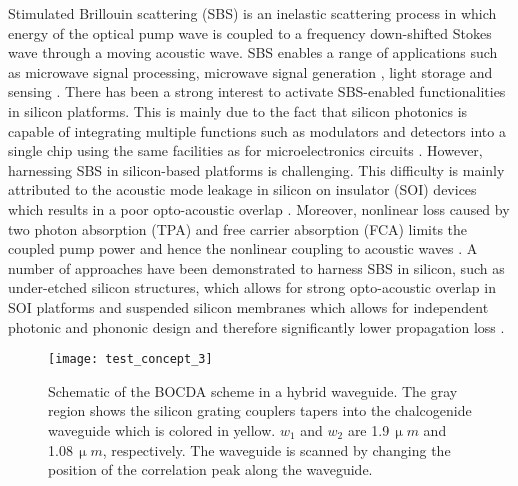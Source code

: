 \documentclass[superscriptaddress, nofootinbib, twocolumn, amsmath,amssymb, aps, pra, notitlepage, longbibliography]{revtex4-1}
\begin{document}
%
%

Stimulated Brillouin scattering (SBS) is an inelastic scattering process in which energy of the optical pump wave is coupled to a frequency down-shifted Stokes wave through a moving acoustic wave. SBS enables a range of applications such as microwave signal processing\cite{Marpaung2013,Pagani2014a,Santagiustina2013}, microwave signal generation \cite{Li2013,Merklein2016}, light storage \cite{Merklein2017,Dong2015,Galland2014,Fang2016b} and sensing \cite{Hotate2012,Song2006,Antman2016,Jia2017,Godet2017,Nikles1996a,Bao1993a}. There has been a strong interest to activate SBS-enabled functionalities in silicon platforms. This is mainly due to the fact that silicon photonics is capable of integrating multiple functions such as modulators and detectors into a single chip using the same facilities as for microelectronics circuits \cite{Chrostowski2013}.
However, harnessing SBS in silicon-based platforms is challenging. This difficulty is mainly attributed to the acoustic mode leakage in silicon on insulator (SOI) devices which results in a poor opto-acoustic overlap \cite{Poulton2013}. Moreover, nonlinear loss caused by two photon absorption (TPA) and free carrier absorption (FCA) limits the coupled pump power and hence the nonlinear coupling to acoustic waves \cite{Kittlaus2015}. 
A number of approaches have been demonstrated to harness SBS in silicon, such as under-etched silicon structures, which allows for strong opto-acoustic overlap in SOI platforms \cite{VanLaer2015} and suspended silicon membranes which allows for independent photonic and phononic design and therefore significantly lower propagation loss \cite{Kittlaus2015}. 

\begin{figure}[b!]
\centering
\texttt{[image: test\_concept\_3]}
\caption{Schematic of the BOCDA scheme in a hybrid waveguide. The gray region shows the silicon grating couplers tapers into the chalcogenide waveguide which is colored in yellow. $w_{1}$ and $w_{2}$ are 1.9\,$\upmu m$ and 1.08\,$\upmu m$, respectively. The waveguide is scanned by changing the position of the correlation peak along the waveguide.}
\label{fig:test_concept}
\end{figure}
\end{document}
